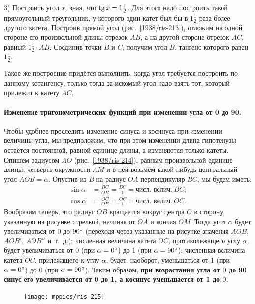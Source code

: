 \documentclass[oneside]{book}
\begin{document}
3) Построить угол $x$, зная, что $\mathrm{tg}\, x=1\tfrac12$.
Для этого надо построить такой прямоугольный треугольник, у которого один катет был бы в $1\tfrac12$ раза более другого катета.
Построив прямой угол (рис.~\ref{1938/ris-213}), отложим на одной стороне его произвольной длины отрезок $AB$, а на другой стороне отрезок $AC$, равный $1\tfrac12\cdot AB$.
Соединив точки $B$ и $C$, получим угол $B$, тангенс которого равен $1\tfrac12$.

Такое же построение придётся выполнить, когда угол требуется построить по данному котангенсу, только тогда за искомый угол надо взять тот, который прилежит к катету $AC$.

\paragraph{Изменение тригонометрических функций при изменении угла от 0 до 90\textdegree.}\label{1938/205} %
Чтобы удобнее проследить изменение синуса и косинуса при изменении величины угла, мы предположим, что при этом изменении длина гипотенузы остаётся постоянной, равной единице длины, а изменяются только катеты.
Опишем радиусом $AO$ (рис.~\ref{1938/ris-214}), равным произвольной единице длины, четверть окружности $AM$ и в ней возьмём какой-нибудь центральный угол $AOB=\alpha$.
Опустив из $B$ на радиус $OA$ перпендикуляр $BC$, мы будем иметь:
\begin{align*}
\sin\alpha&=\frac{BC}{OB}=\frac{BC}{1}=\text{числ. велич.}\ BC;
\\
\cos\alpha&=\frac{OC}{OB}=\frac{OC}{1}=\text{числ. велич.}\ OC.
\end{align*}
Вообразим теперь, что радиус $OB$ вращается вокруг центра $O$ в сторону, указанную на рисунке стрелкой, начиная от $OA$ и кончая $OM$.
Тогда угол $\alpha$ будет увеличиваться от 0 до $90\degree$ (переходя через указанные на рисунке значения $AOB$, $AOB'$, $AOB''$ и~т.~д.);
численная величина катета $OC$, противолежащего углу $\alpha$, будет увеличиваться от 0 (при $\alpha=0\degree$) до 1 (при $\alpha=90\degree$);
численная величина катета $OC$, прилежащего к углу $\alpha$, будет, наоборот, уменьшаться от 1 (при $\alpha=0\degree$) до 0 (при $\alpha=90\degree$).
Таким образом, \textbf{при возрастании угла от 0 до {90\textdegree} синус его увеличивается от 0 до 1, а косинус уменьшается от 1 до 0.}

\begin{figure}
\centering
\texttt{[image: mppics/ris-215]}
\caption{}\label{1938/ris-215}
\end{figure}
\end{document}
